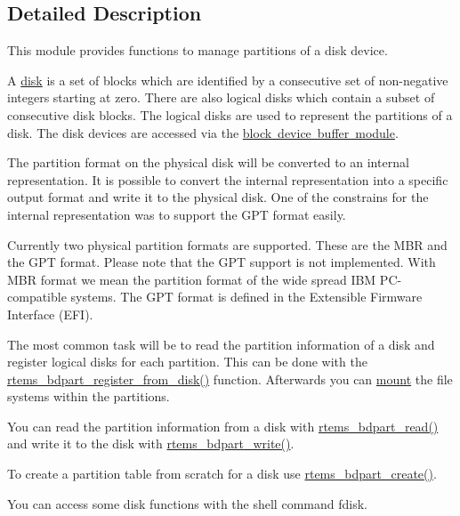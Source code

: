 \subsection{Detailed Description}
This module provides functions to manage partitions of a disk device. 

A \mbox{\hyperlink{group__rtems__disk}{disk}} is a set of blocks which are identified by a consecutive set of non-\/negative integers starting at zero. There are also logical disks which contain a subset of consecutive disk blocks. The logical disks are used to represent the partitions of a disk. The disk devices are accessed via the \mbox{\hyperlink{group__rtems__disk}{block device buffer module}}.

The partition format on the physical disk will be converted to an internal representation. It is possible to convert the internal representation into a specific output format and write it to the physical disk. One of the constrains for the internal representation was to support the G\+PT format easily.

Currently two physical partition formats are supported. These are the M\+BR and the G\+PT format. Please note that the G\+PT support is not implemented. With M\+BR format we mean the partition format of the wide spread I\+BM P\+C-\/compatible systems. The G\+PT format is defined in the Extensible Firmware Interface (E\+FI).

The most common task will be to read the partition information of a disk and register logical disks for each partition. This can be done with the \mbox{\hyperlink{group__rtems__bdpart_ga9b0517982a75560e134c808e70885b81}{rtems\+\_\+bdpart\+\_\+register\+\_\+from\+\_\+disk()}} function. Afterwards you can \mbox{\hyperlink{group__rtems__fstab_gaa1e00bfe1aa6bce349c2c73092a39cc6}{mount}} the file systems within the partitions.

You can read the partition information from a disk with \mbox{\hyperlink{group__rtems__bdpart_ga1ffdc1b7fc86d324faa9b93500ab0e63}{rtems\+\_\+bdpart\+\_\+read()}} and write it to the disk with \mbox{\hyperlink{group__rtems__bdpart_gaa8b69004c352fe7867bdcb551453beb0}{rtems\+\_\+bdpart\+\_\+write()}}.

To create a partition table from scratch for a disk use \mbox{\hyperlink{group__rtems__bdpart_ga208abbe74a399a6e38115ab8eeab6eb5}{rtems\+\_\+bdpart\+\_\+create()}}.

You can access some disk functions with the shell command {\ttfamily fdisk}.

